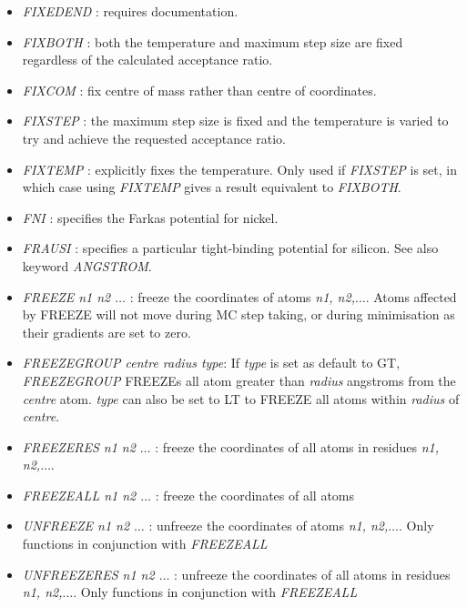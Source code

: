 \documentclass[12pt,a4paper,dvips]{article}
\begin{document}
\begin{itemize}
\item {\it FIXEDEND \/}: requires documentation.

\item {\it FIXBOTH \/}: both the temperature and maximum step size are fixed regardless of
the calculated acceptance ratio.

\item {\it FIXCOM \/}: fix centre of mass rather than centre of coordinates.

\item {\it FIXSTEP \/}: the maximum step size is fixed and the temperature is varied to
try and achieve the requested acceptance ratio.

\item {\it FIXTEMP \/}: explicitly fixes the temperature. Only used if {\it FIXSTEP\/} is set, in 
which case using {\it FIXTEMP\/} gives a result equivalent to {\it FIXBOTH\/}.

\item {\it FNI \/}: specifies the Farkas potential for nickel.

\item {\it FRAUSI \/}: specifies a particular tight-binding potential for silicon.
See also keyword {\it ANGSTROM\/}.

\item {\it FREEZE n1 n2 $\ldots$ \/}: freeze the coordinates of atoms {\it n1, n2,$\ldots$}. Atoms affected by FREEZE will not move during MC step taking, 
or during minimisation as their gradients are set to zero.

\item {\it FREEZEGROUP centre radius type\/}: If {\it type} is set as default to {\textrm GT}, {\it FREEZEGROUP\/} FREEZEs all atom greater than {\it radius} angstroms from the {\it centre} atom. {\it type} can also be set to LT to FREEZE all atoms within {\it radius} of {\it centre}.

\item {\it FREEZERES n1 n2 $\ldots$ \/}: freeze the coordinates of all atoms in residues {\it n1, n2,$\ldots$}.

\item {\it FREEZEALL n1 n2 $\ldots$ \/}: freeze the coordinates of all atoms 

\item {\it UNFREEZE n1 n2 $\ldots$ \/}: unfreeze the coordinates of atoms {\it n1, n2,$\ldots$}. Only functions in conjunction with 
{\it FREEZEALL\/}

\item {\it UNFREEZERES n1 n2 $\ldots$ \/}: unfreeze the coordinates of all atoms in residues {\it n1, n2,$\ldots$}. Only functions in conjunction with 
{\it FREEZEALL\/}


\end{itemize}
\end{document}
